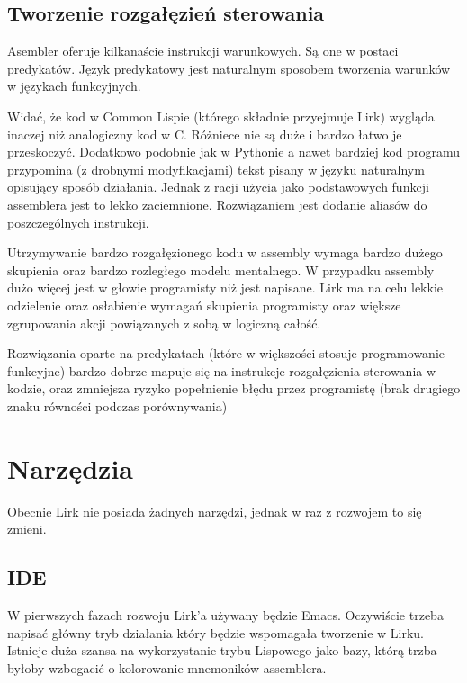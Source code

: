 \documentclass[11pt]{article}
\begin{document}
\subsection{Tworzenie rozgałęzień sterowania}
Asembler oferuje kilkanaście instrukcji warunkowych. Są one w postaci predykatów. Język predykatowy jest naturalnym sposobem tworzenia warunków w językach funkcyjnych. 

\begin{multicols}{3}

\columnbreak

\columnbreak

\end{multicols}

Widać, że kod w Common Lispie (którego składnie przyejmuje Lirk) wygląda inaczej niż analogiczny kod w C. Różniece nie są duże i bardzo łatwo je przeskoczyć. Dodatkowo podobnie jak w Pythonie a nawet bardziej kod programu przypomina (z drobnymi modyfikacjami) tekst pisany w języku naturalnym opisujący sposób działania. Jednak z racji użycia jako podstawowych funkcji assemblera jest to lekko zaciemnione. Rozwiązaniem jest dodanie aliasów do poszczególnych instrukcji. 

Utrzymywanie bardzo rozgałęzionego kodu w assembly wymaga bardzo dużego skupienia oraz bardzo rozległego modelu mentalnego. W przypadku assembly dużo więcej jest w głowie programisty niż jest napisane.
Lirk ma na celu lekkie odzielenie oraz osłabienie wymagań skupienia programisty oraz większe zgrupowania akcji powiązanych z sobą w logiczną całość.

Rozwiązania oparte na predykatach (które w większości stosuje programowanie funkcyjne) bardzo dobrze mapuje się na instrukcje rozgałęzienia sterowania w kodzie,
oraz zmniejsza ryzyko popełnienie błędu przez programistę (brak drugiego znaku równości podczas porównywania)

\section{Narzędzia}
Obecnie Lirk nie posiada żadnych narzędzi, jednak w raz z rozwojem to się zmieni.
\subsection{IDE}
W pierwszych fazach rozwoju Lirk'a używany będzie Emacs. 
Oczywiście trzeba napisać główny tryb działania który będzie wspomagała tworzenie w Lirku. Istnieje duża szansa na wykorzystanie trybu Lispowego jako bazy, którą trzba byłoby wzbogacić o kolorowanie mnemoników assemblera.
\end{document}

